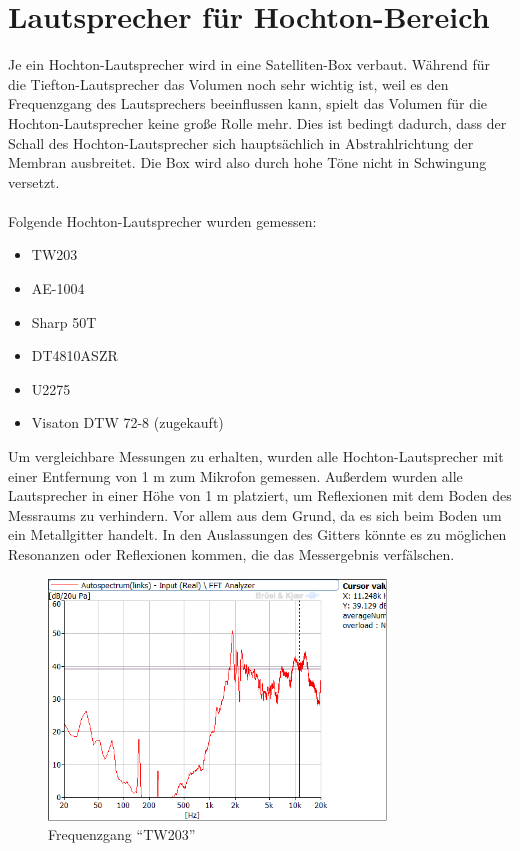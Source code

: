 
\newpage
\section{Lautsprecher für Hochton-Bereich}\label{sec:4.3}
Je ein Hochton-Lautsprecher wird in eine Satelliten-Box verbaut.
Während für die Tiefton-Lautsprecher das Volumen noch sehr wichtig ist, weil es den Frequenzgang des Lautsprechers beeinflussen kann, spielt das Volumen für die Hochton-Lautsprecher keine große Rolle mehr.
Dies ist bedingt dadurch, dass der Schall des Hochton-Lautsprecher sich hauptsächlich in Abstrahlrichtung der Membran ausbreitet.
Die Box wird also durch hohe Töne nicht in Schwingung versetzt.
\\ \\
Folgende Hochton-Lautsprecher wurden gemessen:
\begin{itemize}
	\item TW203
	\item AE-1004
	\item Sharp 50T
	\item DT4810ASZR
	\item U2275
	\item Visaton DTW 72-8 (zugekauft)
\end{itemize}
Um vergleichbare Messungen zu erhalten, wurden alle Hochton-Lautsprecher mit einer Entfernung von 1 m zum Mikrofon gemessen.
Außerdem wurden alle Lautsprecher in einer Höhe von 1 m platziert, um Reflexionen mit dem Boden des Messraums zu verhindern.
Vor allem aus dem Grund, da es sich beim Boden um ein Metallgitter handelt.
In den Auslassungen des Gitters könnte es zu möglichen Resonanzen oder Reflexionen kommen, die das Messergebnis verfälschen.
\newpage

\begin{figure} [H]
	\centering
	\includegraphics[width=0.8\textwidth]{img/LSMessung/HT/TW203_1m_erhoeht.png}
	\caption{Frequenzgang \enquote{TW203}}
	\label{fig:4.3.1}
\end{figure}

